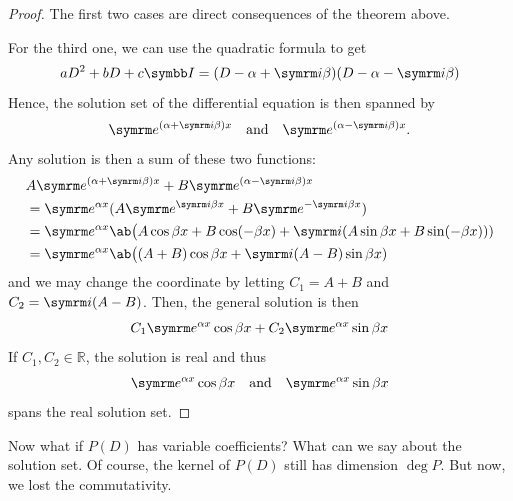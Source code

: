 \begin{proof}
  The first two cases are direct consequences of the theorem above.

  For the third one, we can use the quadratic formula to get
  \begin{equation}
    aD^2 + bD + c\iden = (D - \alpha + \im \beta)(D - \alpha - \im \beta)
  \end{equation}
  Hence, the solution set of the differential equation is then spanned by
  \begin{equation}
    \e^{(\alpha+\im \beta)x} \mathand \e^{(\alpha-\im \beta)x}.
  \end{equation}
  Any solution is then a sum of these two functions:
  \begin{align}
    & A \e^{(\alpha+\im \beta)x} + B \e^{(\alpha-\im \beta)x} \nonumber                                                 \\
    & = \e^{\alpha x} (A \e^{\im \beta x} + B \e^{-\im \beta x})                                                        \\
    & = \e^{\alpha x} \ab\big(A \cos \beta x + B \cos (- \beta x) + \im (A \sin \beta x + B \sin (-\beta x))) \nonumber \\
    & = \e^{\alpha x} \ab\big((A + B)\cos \beta x + \im (A - B) \sin \beta x)
  \end{align}
  and we may change the coordinate by letting \(C_1 = A + B\) and \(C_2 = \im (A - B)\).
  Then, the general solution is then
  \begin{equation}
    C_1\e^{\alpha x} \cos \beta x + C_2\e^{\alpha x} \sin \beta x
  \end{equation}
  If \(C_1, C_2 \in \mathbb{R}\), the solution is real and thus
  \begin{equation}
    \e^{\alpha x} \cos \beta x \mathand \e^{\alpha x} \sin\beta x
  \end{equation}
  spans the real solution set.
\end{proof}

Now what if \(P(D)\) has variable coefficients? What can we say about the solution set. Of
course, the kernel of \(P(D)\) still has dimension \(\deg P\). But now, we lost the commutativity.
